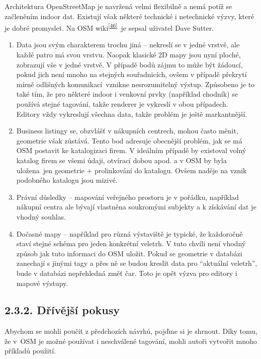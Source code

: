 Architektura OpenStreetMap je navržená velmi flexibilně a nemá potíž se začleněním indoor dat. Existují však některé technické i netechnické výzvy, které je dobré promyslet. Na OSM wiki\textsuperscript{\href{}{{[}46{]}}}~je sepsal uživatel Dave Sutter.

\begin{enumerate}
\tightlist
\item
  Data jsou svým charakterem trochu jiná -- nekreslí se v jedné vrstvě, ale každé patro má svou vrstvu. Naopak klasické 2D mapy jsou nyní ploché, zobrazují vše v jedné vrstvě. V případě bodů zájmu to může být žádoucí, pokud jich není mnoho na stejných souřadnicích, ovšem v případě překrytí mírně odlišných komunikací~vznikne nesrozumitelný výstup. Způsobeno je to také tím, že pro některé indoor i venkovní prvky (například chodník) se používá stejné tagování, takže renderer je vykreslí v obou případech.\\
  Editory vždy vykreslují všechna data, takže problém je ještě markantnější.
\item
  Business listingy se, obzvlášť v nákupních centrech, mohou často měnit, geometrie však zůstává. Tento bod adresuje obecnější problém, jak se má OSM postavit ke katalogizaci firem. V ideálním případě by existoval volný katalog firem se všemi údaji, otvírací dobou apod. a v OSM by byla uložena~jen geometrie + prolinkování do katalogu. Ovšem naděje na vznik podobného katalogu jsou mizivé.
\item
  Právní důsledky -- mapování veřejného prostoru je v pořádku, například nákupní centra ale bývají vlastněna soukromými subjekty a k získávání dat je vhodný souhlas.
\item
  Dočasné mapy -- například pro různá výstaviště je typické, že každoročně staví stejné schéma pro jeden konkrétní veletrh. V tuto chvíli není vhodný způsob jak tuto informaci do OSM uložit. Pokud se geometrie v databázi zanechají s jinými tagy a přes ně se budou kreslit data pro ``aktuální veletrh'', bude v databázi nepřehledná změť čar. Toto je opět výzva pro editory i mapové výstupy.
\end{enumerate}

\subsection{2.3.2. Dřívější pokusy}\label{dux159uxedvux11bjux161uxed-pokusy}

Abychom se mohli poučit z předchozích návrhů, pojďme si je shrnout. Díky tomu, že v~OSM je možné používat i neschválené tagování, mohli autoři vytvořit mnoho příkladů použití.

